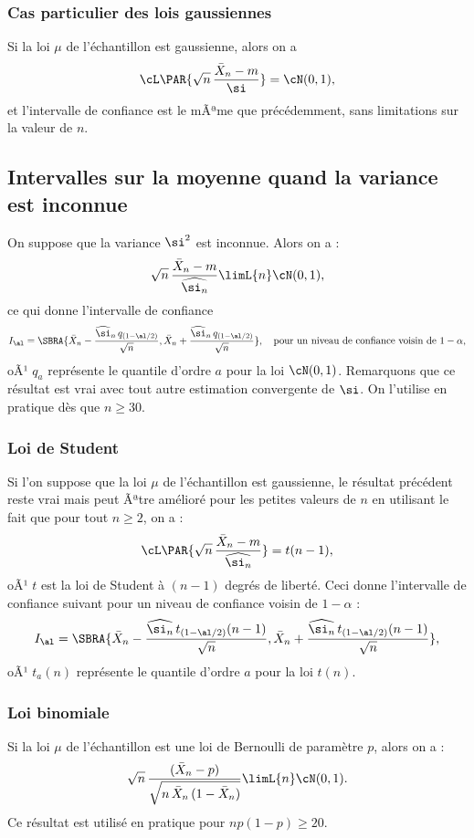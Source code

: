 \subsubsection{Cas particulier des lois gaussiennes}

Si la loi $\mu$ de l'échantillon est gaussienne, alors on a
$$
\cL\PAR{\sqrt{n}\,\frac{\bar{X}_n-m}{\si}} = \cN(0,1),
$$
et l'intervalle de confiance est le mÃªme que précédemment, sans limitations
sur la valeur de $n$.


\subsection{Intervalles sur la moyenne quand la variance est inconnue} 

On suppose que la variance $\si^2$ est inconnue. Alors on a :
$$
\sqrt{n}\,\frac{\bar{X}_n-m}{\widehat{\si_n}} \limL{n} \cN(0,1),
$$
ce qui donne l'intervalle de confiance
$$
I_\al=\SBRA{\bar{X}_n-\frac{\widehat{\si}_n\,q_{(1-\al/2)}}{\sqrt{n}},
  \bar{X}_n+\frac{\widehat{\si}_n\,q_{(1-\al/2)}}{\sqrt{n}}},
\text{\quad pour un niveau de confiance voisin de $1-\alpha$},
$$
oÃ¹ $q_a$ représente le quantile d'ordre $a$ pour la loi $\cN(0,1)$.
Remarquons que ce résultat est vrai avec tout autre estimation convergente
de $\si$. On l'utilise en pratique dès que $n \geq 30$.

\subsubsection{Loi de Student} 

Si l'on suppose que la loi $\mu$ de l'échantillon est gaussienne, le résultat
précédent reste vrai mais peut Ãªtre amélioré pour les petites valeurs de $n$
en utilisant le fait que pour tout $n\geq 2$, on a :
$$
\cL\PAR{\sqrt{n}\,\frac{\bar{X}_n-m}{\widehat{\si_n}}} = t(n-1),
$$
oÃ¹ $t$ est la loi de Student à $(n-1)$ degrés de liberté. Ceci donne
l'intervalle de confiance suivant pour un niveau de confiance voisin de
$1-\alpha$ :
$$
I_\al=\SBRA{\bar{X}_n-\frac{\widehat{\si_n}\,t_{(1-\al/2)}(n-1)}{\sqrt{n}},
  \bar{X}_n+\frac{\widehat{\si_n}\,t_{(1-\al/2)}(n-1)}{\sqrt{n}}},
$$
oÃ¹ $t_a(n)$ représente le quantile d'ordre $a$ pour la loi $t(n)$.

\subsubsection{Loi binomiale} 

Si la loi $\mu$ de l'échantillon est une loi de Bernoulli de paramètre $p$,
alors on a :
$$
\sqrt{n}\,\frac{(\bar{X}_n-p)}{\sqrt{n\,\bar{X}_n\,(1-\bar{X}_n)}}
\limL{n}\cN(0,1).
$$
Ce résultat est utilisé en pratique pour $np(1-p)\geq 20$.


